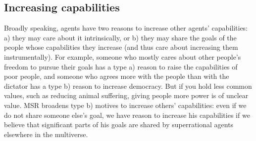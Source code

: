 \hypertarget{increasing-capabilities}{\subsection{Increasing
capabilities}\label{increasing-capabilities}}

Broadly speaking, agents have two reasons to increase other agents'
capabilities: a) they may care about it intrinsically, or b) they may
share the goals of the people whose capabilities they increase (and thus
care about increasing them instrumentally). For example, someone who
mostly cares about other people's freedom to pursue their goals has a
type a) reason to raise the capabilities of poor people,
and someone who agrees more with the people than with the dictator has a 
type b) reason to increase democracy. But if you hold less
common values, such as reducing animal suffering, giving people more
power is of unclear value. MSR broadens type b) motives to increase
others' capabilities: even if we do not share someone else's goal, we
have reason to increase his capabilities if we believe that significant
parts of his goals are shared by superrational agents elsewhere in the
multiverse.

